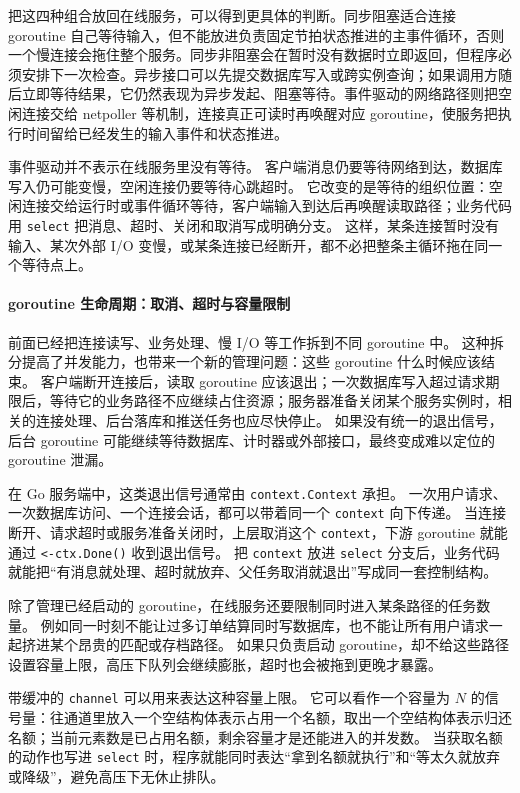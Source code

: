 把这四种组合放回在线服务，可以得到更具体的判断。同步阻塞适合连接 goroutine 自己等待输入，但不能放进负责固定节拍状态推进的主事件循环，否则一个慢连接会拖住整个服务。同步非阻塞会在暂时没有数据时立即返回，但程序必须安排下一次检查。异步接口可以先提交数据库写入或跨实例查询；如果调用方随后立即等待结果，它仍然表现为异步发起、阻塞等待。事件驱动的网络路径则把空闲连接交给 netpoller 等机制，连接真正可读时再唤醒对应 goroutine，使服务把执行时间留给已经发生的输入事件和状态推进。

事件驱动并不表示在线服务里没有等待。
客户端消息仍要等待网络到达，数据库写入仍可能变慢，空闲连接仍要等待心跳超时。
它改变的是等待的组织位置：空闲连接交给运行时或事件循环等待，客户端输入到达后再唤醒读取路径；业务代码用 \texttt{select} 把消息、超时、关闭和取消写成明确分支。
这样，某条连接暂时没有输入、某次外部 I/O 变慢，或某条连接已经断开，都不必把整条主循环拖在同一个等待点上。

\paragraph{goroutine 生命周期：取消、超时与容量限制}

前面已经把连接读写、业务处理、慢 I/O 等工作拆到不同 goroutine 中。
这种拆分提高了并发能力，也带来一个新的管理问题：这些 goroutine 什么时候应该结束。
客户端断开连接后，读取 goroutine 应该退出；一次数据库写入超过请求期限后，等待它的业务路径不应继续占住资源；服务器准备关闭某个服务实例时，相关的连接处理、后台落库和推送任务也应尽快停止。
如果没有统一的退出信号，后台 goroutine 可能继续等待数据库、计时器或外部接口，最终变成难以定位的 goroutine 泄漏。

在 Go 服务端中，这类退出信号通常由 \texttt{context.Context} 承担。
一次用户请求、一次数据库访问、一个连接会话，都可以带着同一个 \texttt{context} 向下传递。
当连接断开、请求超时或服务准备关闭时，上层取消这个 \texttt{context}，下游 goroutine 就能通过 \texttt{<-ctx.Done()} 收到退出信号。
把 \texttt{context} 放进 \texttt{select} 分支后，业务代码就能把“有消息就处理、超时就放弃、父任务取消就退出”写成同一套控制结构。

除了管理已经启动的 goroutine，在线服务还要限制同时进入某条路径的任务数量。
例如同一时刻不能让过多订单结算同时写数据库，也不能让所有用户请求一起挤进某个昂贵的匹配或存档路径。
如果只负责启动 goroutine，却不给这些路径设置容量上限，高压下队列会继续膨胀，超时也会被拖到更晚才暴露。

带缓冲的 \texttt{channel} 可以用来表达这种容量上限。
它可以看作一个容量为 $N$ 的信号量：往通道里放入一个空结构体表示占用一个名额，取出一个空结构体表示归还名额；当前元素数是已占用名额，剩余容量才是还能进入的并发数。
当获取名额的动作也写进 \texttt{select} 时，程序就能同时表达“拿到名额就执行”和“等太久就放弃或降级”，避免高压下无休止排队。

